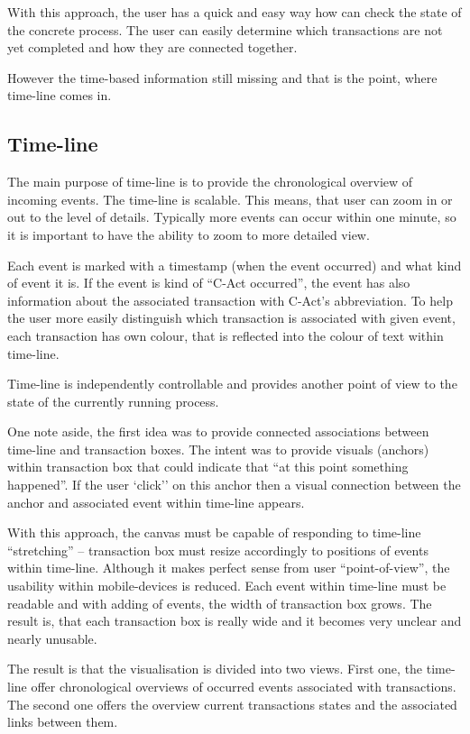 With this approach, the user has a quick and easy way how can check the state of the concrete process. The user can easily determine which transactions are not yet completed and how they are connected together. 

However the time-based information still missing and that is the point, where time-line comes in.
\subsection{Time-line}
The main purpose of time-line is to provide the chronological overview of incoming events. The time-line is scalable. This means, that user can zoom in or out to the level of details. Typically more events can occur within one minute, so it is important to have the ability to zoom to more detailed view. 

Each event is marked with a timestamp (when the event occurred) and what kind of event it is. If the event is kind of ``C-Act occurred'', the event has also information about the associated transaction with C-Act's abbreviation. To help the user more easily distinguish which transaction is associated with given event, each transaction has own colour, that is reflected into the colour of text within time-line. 

Time-line is independently controllable and provides another point of view to the state of the currently running process. 

One note aside, the first idea was to provide connected associations between time-line and transaction boxes. The intent was to provide visuals (anchors) within transaction box that could indicate that ``at this point something happened''. If the user `click'' on this anchor then a visual connection between the anchor and associated event within time-line appears. 

With this approach, the canvas must be capable of responding to time-line ``stretching'' -- transaction box must resize accordingly to positions of events within time-line. Although it makes perfect sense from user ``point-of-view'', the usability within mobile-devices is reduced. Each event within time-line must be readable and with adding of events, the width of transaction box grows. The result is, that each transaction box is really wide and it becomes very unclear and nearly unusable.

The result is that the visualisation is divided into two views. First one, the time-line offer chronological overviews of occurred events associated with transactions. The second one offers the overview current transactions states and the associated links between them. 

